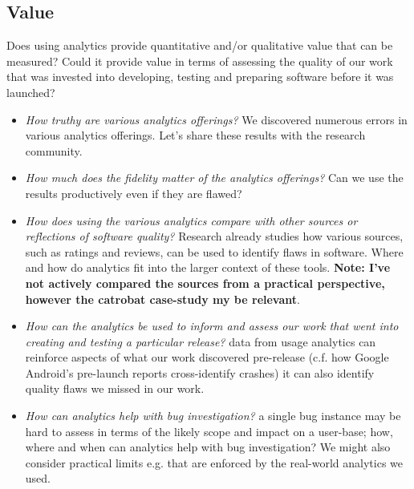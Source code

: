 \subsection{Value}
Does using analytics provide quantitative and/or qualitative value that can be measured? Could it provide value in terms of assessing the quality of our work that was invested into developing, testing and preparing software before it was launched?
\begin{itemize}
    \item \emph{How truthy are various analytics offerings?} We discovered numerous errors in various analytics offerings. Let's share these results with the research community.
    \item \emph{How much does the fidelity matter of the analytics offerings?} Can we use the results productively even if they are flawed?
    \item \emph{How does using the various analytics compare with other sources or reflections of software quality?} Research already studies how various sources, such as ratings and reviews, can be used to identify flaws in software. Where and how do analytics fit into the larger context of these tools. \textbf{Note: I've not actively compared the sources from a practical perspective, however the catrobat case-study my be relevant}.
    \item \emph{How can the analytics be used to inform and assess our work that went into creating and testing a particular release?} data from usage analytics can reinforce aspects of what our work discovered pre-release (c.f. how Google Android's pre-launch reports cross-identify crashes) it can also identify quality flaws we missed in our work.
    \item \emph{How can analytics help with bug investigation?} a single bug instance may be hard to assess in terms of the likely scope and impact on a user-base; how, where and when can analytics help with bug investigation? We might also consider practical limits e.g. that are enforced by the real-world analytics we used. 
\end{itemize}

